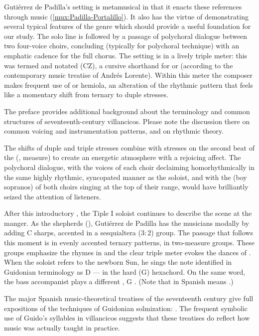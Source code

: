 Gutiérrez de Padilla's setting is metamusical in that it enacts these
references through music (\cref{mux:Padilla-Portalillo}).
It also has the virtue of demonstrating several typical features of the genre
which should provide a useful foundation for our study.
The solo line is followed by a passage of polychoral dialogue between two
four-voice choirs, concluding (typically for polychoral technique) with an
emphatic cadence for the full chorus.  
The setting is in a lively triple meter: this was termed  and notated \meterCZ{} (CZ), a cursive shorthand for
\meterCThreeTwo{} or \meterCThree{} (according to the contemporary music
treatise of Andrés Lorente).%
    \citXXX[Lorente]
Within this meter the composer makes frequent use of  or
hemiola, an alteration of the rhythmic pattern that feels like a momentary
shift from ternary to duple stresses.%
\begin{Footnote}
    The preface provides additional background about the terminology and common structures of seventeenth-century villancicos.
    Please note the discussion there on common voicing and instrumentation patterns, and on rhythmic theory.
\end{Footnote}
The shifts of duple and triple stresses combine with stresses on the second
beat of the  (, measure) to create an energetic
atmosphere with a rejoicing affect.  
The polychoral dialogue, with the voices of each choir declaiming
homorhythmically in the same highly rhythmic, syncopated manner as the soloist,
and with the  (boy sopranos) of both choirs singing at the top of
their range, would have brilliantly seized the attention of listeners.

After this introductory , the Tiple I soloist continues to
describe the scene at the manger.  
As the shepherds  (),
Gutiérrez de Padilla has the musicians  modally by adding C
sharps, accented in a sesquialtera ($3:2$) group.
The passage that follows this moment is in evenly accented ternary patterns, in
two-measure groups.  
These groups emphasize the rhymes in 
and the clear triple meter evokes the dances of .
When the soloist refers to the newborn Sun, he sings the note identified in
Guidonian terminology as D --- in the hard (G)
hexachord.  
On the same word, the bass accompanist plays a different , G
. 
(Note that  in Spanish means .)%
\begin{Footnote}
    The major Spanish music-theoretical treatises of the seventeenth century
    give full expositions of the techniques of Guidonian solmization:
    \autocites{Cerone:Melopeo}{Lorente:Porque}.
    The frequent symbolic use of Guido's syllables in villancicos suggests that
    these treatises do reflect how music was actually taught in practice.
\end{Footnote}

